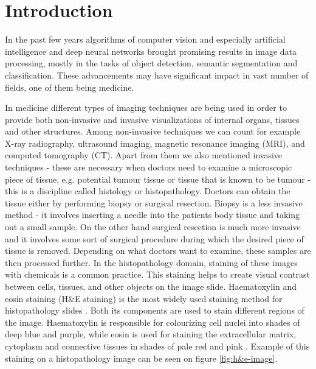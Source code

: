 \chapter{Introduction}



In the past few years algorithms of computer vision and especially artificial intelligence and deep neural networks brought promising results in image data processing, mostly in the tasks of object detection, semantic segmentation and classification. These advancements may have significant impact in vast number of fields, one of them being medicine. 

In medicine different types of imaging techniques are being used in order to provide both non-invasive and invasive visualizations of internal organs, tissues and other structures. Among non-invasive techniques we can count for example X-ray radiography, ultrasound imaging, magnetic resonance imaging (MRI), and computed tomography (CT). Apart from them we also mentioned invasive techniques - these are necessary when doctors need to examine a microscopic piece of tissue, e.g. potential tumour tissue or tissue that is known to be tumour - this is a discipline called histology or histopathology. Doctors can obtain the tissue either by performing biopsy or surgical resection. Biopsy is a less invasive method - it involves inserting a needle into the patients body tissue and taking out a small sample. On the other hand surgical resection is much more invasive and it involves some sort of surgical procedure during which the desired piece of tissue is removed. Depending on what doctors want to examine, these samples are then processed further. In the histopathology domain, staining of these images with chemicals is a common practice. This staining helps to create visual contrast between cells, tissues, and other objects on the image slide. Haematoxylin and eosin staining (H\&E staining) is the most widely used staining method for histopathology slides \cite{Dey2022}. Both its components are used to stain different regions of the image. Haematoxylin is responsible for colourizing cell nuclei into shades of deep blue and purple, while eosin is used for staining the extracellular matrix, cytoplasm and connective tissues in shades of pale red and pink \cite{Dey2022}. Example of this staining on a histopathology image can be seen on figure \ref{fig:h&e-image}.


